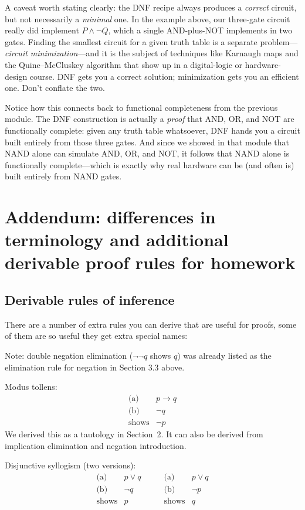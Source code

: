 \documentclass[11pt]{article}
\begin{document}
A caveat worth stating clearly: the DNF recipe always produces a \emph{correct} circuit, but not necessarily a \emph{minimal} one. In the example above, our three-gate circuit really did implement $P \wedge \lnot Q$, which a single AND-plus-NOT implements in two gates. Finding the smallest circuit for a given truth table is a separate problem---\emph{circuit minimization}---and it is the subject of techniques like Karnaugh maps and the Quine--McCluskey algorithm that show up in a digital-logic or hardware-design course. DNF gets you a correct solution; minimization gets you an efficient one. Don't conflate the two.

Notice how this connects back to functional completeness from the previous module. The DNF construction is actually a \emph{proof} that AND, OR, and NOT are functionally complete: given any truth table whatsoever, DNF hands you a circuit built entirely from those three gates. And since we showed in that module that NAND alone can simulate AND, OR, and NOT, it follows that NAND alone is functionally complete---which is exactly why real hardware can be (and often is) built entirely from NAND gates.

\section{Addendum: differences in terminology and additional derivable proof rules for homework}

\subsection{Derivable rules of inference}

There are a number of extra rules you can derive that are useful for proofs, some of them are so useful they get extra special names:

Note: double negation elimination ($\lnot\lnot q$ shows $q$) was already listed as the elimination rule for negation in Section 3.3 above.

Modus tollens:
\[
  \begin{array}{rl}
    \text{(a)} & p \to q \\
    \text{(b)} & \lnot q \\
    \hline
    \text{shows} & \lnot p
  \end{array}
\]
We derived this as a tautology in Section~2. It can also be derived from implication elimination and negation introduction.

\medskip
\noindent Disjunctive syllogism (two versions):
\[
  \begin{array}{rl}
    \text{(a)} & p \vee q \\
    \text{(b)} & \lnot q \\
    \hline
    \text{shows} & p
  \end{array}
  \qquad
  \begin{array}{rl}
    \text{(a)} & p \vee q \\
    \text{(b)} & \lnot p \\
    \hline
    \text{shows} & q
  \end{array}
\]
\end{document}
